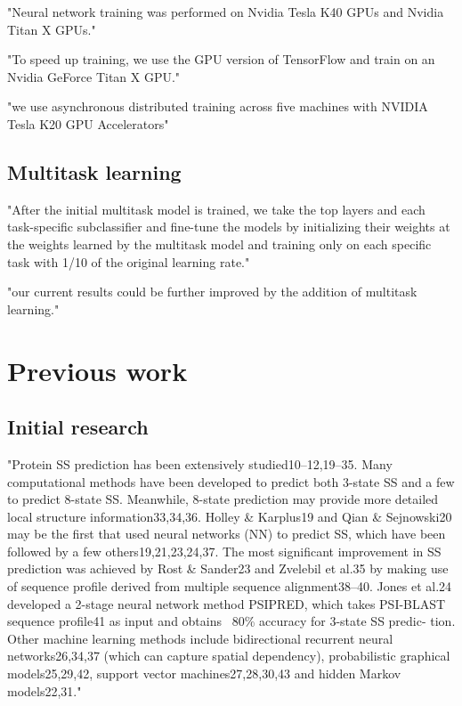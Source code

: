 \documentclass[]{scrartcl}
\begin{document}
"Neural network training was performed on Nvidia Tesla K40 GPUs and Nvidia Titan X GPUs." \cite{Jurtz2017}

"To speed up training, we use the GPU version of TensorFlow and train on an Nvidia GeForce Titan X GPU." \cite{Heffernan2017}

"we use asynchronous distributed training across five machines with NVIDIA Tesla K20 GPU Accelerators" \cite{Busia2017}

\subsection{Multitask learning}
"After the initial multitask model is trained, we take the top layers and each task-specific subclassifier and fine-tune the models by initializing their weights at the weights learned by the multitask model and training only on each specific task with 1/10 of the original learning rate." \cite{Lin2016}

"our current results could be further improved by the addition of multitask learning." \cite{Busia2017}


\section{Previous work}
\subsection{Initial research}
"Protein SS prediction has been extensively studied10–12,19–35. Many computational methods have been developed to predict both 3-state SS and a few to predict 8-state SS. Meanwhile, 8-state prediction may provide more detailed local structure information33,34,36. Holley \& Karplus19 and Qian \& Sejnowski20 may be the first that used neural networks (NN) to predict SS, which have been followed by a few others19,21,23,24,37. The most significant improvement in SS prediction was achieved by Rost \& Sander23 and Zvelebil et al.35 by making use of sequence profile derived from multiple sequence alignment38–40. Jones et al.24 developed a 2-stage neural network method PSIPRED, which takes PSI-BLAST sequence profile41 as input and obtains ~80\% accuracy for 3-state SS predic- tion. Other machine learning methods include bidirectional recurrent neural networks26,34,37 (which can capture spatial dependency), probabilistic graphical models25,29,42, support vector machines27,28,30,43 and hidden Markov models22,31." \cite{Wang2016}
\end{document}
